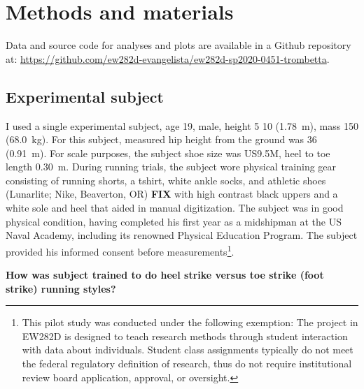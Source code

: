 \section{Methods and materials}
\label{sec:methods}

Data and source code for analyses and plots are available in a Github repository at: \url{https://github.com/ew282d-evangelista/ew282d-sp2020-0451-trombetta}.

\subsection{Experimental subject}
I used a single experimental subject, age \SI{19}{\year}, male, height \SI{5}{\foot} \SI{10}{\inch} (\SI{1.78}{\meter}), mass \SI{150}{\pound} (\SI{68.0}{\kilo\gram}). For this subject, measured hip height from the ground was \SI{36}{\inch} (\SI{0.91}{\meter}). For scale purposes, the subject shoe size was US9.5M, heel to toe length \SI{0.30}{\meter}. During running trials, the subject wore physical training gear consisting of running shorts, a tshirt, white ankle socks, and athletic shoes (Lunarlite; Nike, Beaverton, OR) \textbf{FIX} with high contrast black uppers and a white sole and heel that aided in manual digitization. The subject was in good physical condition, having completed his first year as a midshipman at the US Naval Academy, including its renowned Physical Education Program. The subject provided his informed consent before measurements\footnote{This pilot study was conducted under the following exemption: The project in EW282D is designed to teach research methods through student interaction with data about individuals. Student class assignments typically do not meet the federal regulatory definition of research, thus do not require institutional review board application, approval, or oversight.}.  

\textbf{How was subject trained to do heel strike versus toe strike (foot strike) running styles?}



